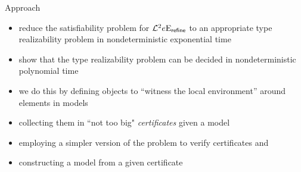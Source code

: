 \documentclass{beamer}
\begin{document}
\begin{frame}{Approach}
\begin{itemize}
  \item reduce the satisfiability problem for $\mathcal{L}^{2}_{{}}{e}\mathrm{E}_{\mathsf{refine}}$
  to an appropriate type realizability problem in nondeterministic exponential
  time
  \item show that the type realizability problem can be decided in
  nondeterministic polynomial time
  \item we do this by defining objects to ``witness the local
  environment'' around elements in models
  \item collecting them in ``not too big" \emph{certificates} given a model
  \item employing a simpler version of the problem to verify certificates and
  \item constructing a model from a given certificate
\end{itemize}
\end{frame}
\end{document}
